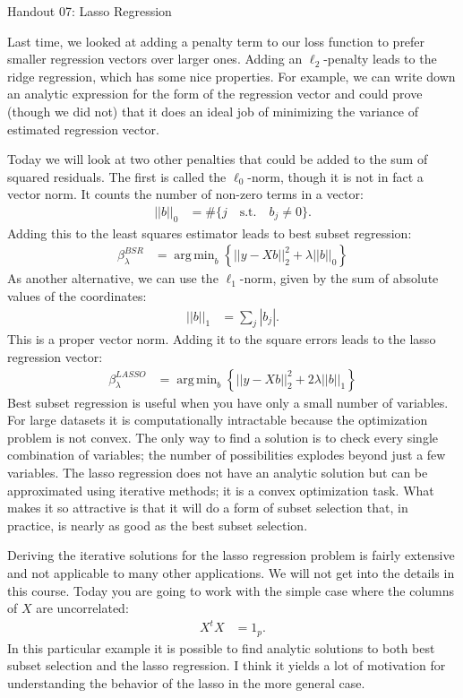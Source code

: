 \documentclass[12pt,hidelinks]{article}
\DeclareMathOperator*{\argmin}{arg\,min}
\numberwithin{equation}{section}
\begin{document}
{\LARGE Handout 07: Lasso Regression}

\vspace*{18pt}

Last time, we looked at adding a penalty term to our loss function to prefer
smaller regression vectors over larger ones. Adding an $\ell_2$-penalty leads
to the ridge regression, which has some nice properties. For example, we can
write down an analytic expression for the form of the regression vector and
could prove (though we did not) that it does an ideal job of minimizing the
variance of estimated regression vector.

Today we will look at two other penalties that could be added to the sum of
squared residuals. The first is called the $\ell_0$-norm, though it is not
in fact a vector norm. It counts the number of non-zero terms in a vector:
\begin{align}
|| b ||_0 &= \# \{ j \quad \text{s.t.} \quad b_j \neq 0 \}.
\end{align}
Adding this to the least squares estimator leads to best subset regression:
\begin{align}
\beta^{BSR}_{\lambda} &= \argmin_b \left\{ || y - Xb||_2^2 + \lambda ||b||_0 \right\}
\end{align}
As another alternative, we can use the $\ell_1$-norm, given by the sum of
absolute values of the coordinates:
\begin{align}
|| b ||_1 &= \sum_j | b_j |.
\end{align}
This is a proper vector norm. Adding it to the square errors leads to the
lasso regression vector:
\begin{align}
\beta^{LASSO}_{\lambda} &= \argmin_b \left\{ || y - Xb||_2^2 + 2 \lambda ||b||_1 \right\}
\end{align}
Best subset regression is useful when you have only a small number of variables.
For large datasets it is computationally intractable because the optimization
problem is not convex. The only way to find a solution is to check every single
combination of variables; the number of possibilities explodes beyond just a few
variables. The lasso regression does not have an analytic solution but can be
approximated using iterative methods; it is a convex optimization task. What
makes it so attractive is that it will do a form of subset selection that, in
practice, is nearly as good as the best subset selection.

Deriving the iterative solutions for the lasso regression problem is fairly
extensive and not applicable to many other applications. We will not get into
the details in this course. Today you are going to work with the simple case
where the columns of $X$ are uncorrelated:
\begin{align}
X^t X &= 1_p. \label{uncor}
\end{align}
In this particular example it is possible to find analytic solutions to both
best subset selection and the lasso regression. I think it yields a lot of
motivation for understanding the behavior of the lasso in the more general
case.
\end{document}
